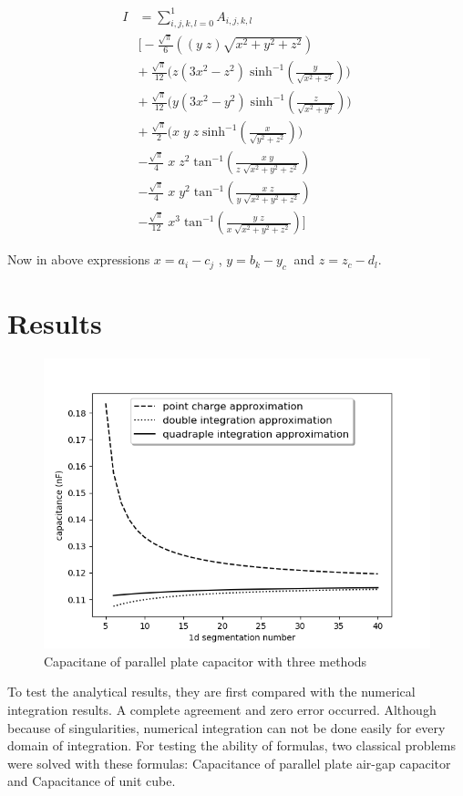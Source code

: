 \documentclass[final,5p,times,twocolumn]{elsarticle}
\begin{document}
\begin{equation}\label {eq:24}
\begin{split}
I& = \sum_{i,j,k,l=0}^1 A_{i,j,k,l}\\
&  \bigg[ -\frac {\sqrt{\pi} } {6} \left((y\; z)\sqrt{x^2 + y^2 + z^2} \right) \\
& +\  \frac {\sqrt{\pi} } {12} \bigg( z(3x^2 - z^2)\;\mathrm{sinh^{-1}}(\frac{y}{\sqrt{x^2 + z^2}}) \bigg)\\
& +\  \frac {\sqrt{\pi} } {12} \bigg( y(3x^2 - y^2)\;\mathrm{sinh^{-1}}(\frac{z}{\sqrt{x^2 + y^2}}) \bigg)\\
& +\  \frac {\sqrt{\pi} } {2} \bigg( x\; y\; z\;\mathrm{sinh^{-1}}(\frac{x}{\sqrt{y^2 + z^2}}) \bigg)\\
&-  \frac {\sqrt{\pi} } {4}\;x \;z^2\;\mathrm{tan^{-1}}(\frac{x\;y}{z\;\sqrt{x^2+y^2 + z^2}})\\
&-  \frac {\sqrt{\pi} } {4}\;x \;y^2\;\mathrm{tan^{-1}}(\frac{x\;z}{y\;\sqrt{x^2+y^2 + z^2}})\\
&-  \frac {\sqrt{\pi} } {12}\;x^3\;\mathrm{tan^{-1}}(\frac{y\;z}{x\;\sqrt{x^2+y^2 + z^2}})\bigg]
\end{split}
\end{equation}

Now in above expressions $x = a_i - c_j$ , $y = b_k - y_c\ $ and $z = z_c - d_l$.
\section{Results}
\begin {figure}[h]
	\center
	\includegraphics[width=\linewidth]	{saeedvshitoshiandzho.png}
	\caption{Capacitane of parallel plate capacitor with three  methods}
\end{figure}
To test the analytical results, they are first compared with the numerical integration results. A complete agreement and zero error occurred. Although because of singularities, numerical integration can not be done easily for every domain of integration. For testing the ability of formulas, two classical problems were solved with these formulas: Capacitance of parallel plate air-gap capacitor and Capacitance of unit cube.
\end{document}
